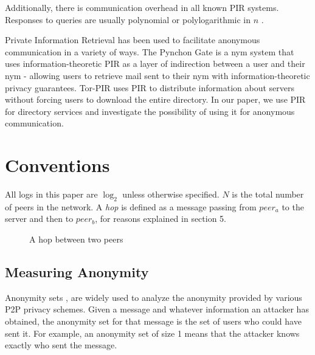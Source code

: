 \documentclass[twocolumn,11pt,english]{article}
\begin{document}
Additionally, there is communication overhead in all known PIR systems. Responses to queries are usually polynomial or polylogarithmic in $n$ \cite{CPIR} \cite{pir}. 

Private Information Retrieval has been used to facilitate anonymous communication in a variety of ways. The Pynchon Gate \cite{sassaman:wpes2005} is a nym system that uses information-theoretic PIR as a layer of indirection between a user and their nym - allowing users to retrieve mail sent to their nym with information-theoretic privacy guarantees. Tor-PIR \cite{MittalOTBG11} uses PIR to distribute information about servers without forcing users to download the entire directory. In our paper, we use PIR for directory services and investigate the possibility of using it for anonymous communication. 

\section{Conventions}
All logs in this paper are $\log_2$ unless otherwise specified. $N$ is the total number of peers in the network. A \textit{hop} is defined as a message passing from $peer_a$ to the server and then to $peer_b$, for reasons explained in section 5.
\begin{figure}[ht]
  \begin{center}
  \end{center}
\caption{A hop between two peers}
\end{figure}

\subsection{Measuring Anonymity}
Anonymity sets \cite{chaum-dc}, are widely used to analyze the anonymity provided by various P2P privacy schemes. Given a message and whatever information an attacker has obtained, the anonymity set for that message is the set of users who could have sent it. For example, an anonymity set of size 1 means that the attacker knows exactly who sent the message.
\end{document}
